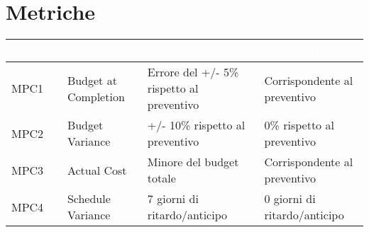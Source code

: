 \section{Metriche}
\begin{center}
  \begin{tabular}{|p{1.7cm}|p{3.5cm}|p{4cm}|p{3.3cm}|} \hline
    \rowcolor[HTML]{036400}
    \textcolor{white}{\textbf{Metrica}} & \textcolor{white}{\textbf{Nome}} & \textcolor{white}{\textbf{Valore Accettabile}} & \textcolor{white}{\textbf{Valore Ottimale}}    \\ \hline
      \rowcolor[HTML]{EFEFEF}
      MPC1 & Budget at Completion & Errore del +/- 5\% rispetto al preventivo & Corrispondente al preventivo \\ \hline
      \rowcolor[HTML]{C0C0C0}
      MPC2 & Budget Variance    &  +/- 10\% rispetto al preventivo & 0\% rispetto al preventivo     \\ \hline
      \rowcolor[HTML]{EFEFEF}
      MPC3 & Actual Cost    & Minore del budget totale  & Corrispondente al preventivo     \\ \hline
      \rowcolor[HTML]{C0C0C0}
      MPC4 & Schedule Variance & 7 giorni di ritardo/anticipo & 0 giorni di ritardo/anticipo     \\ \hline
  \end{tabular}
\end{center}

